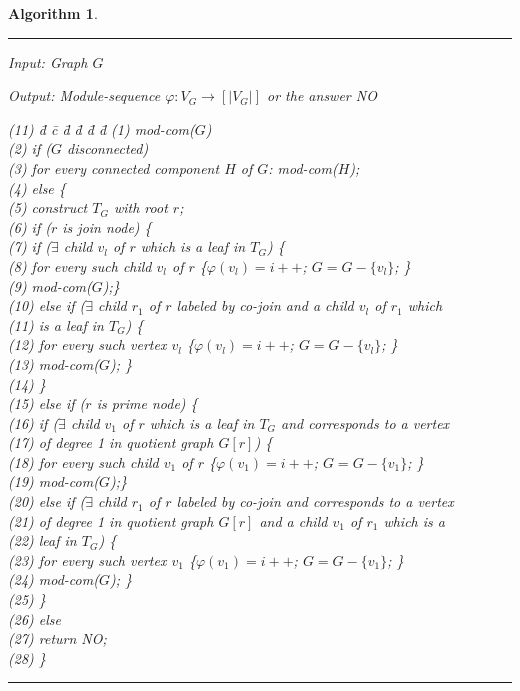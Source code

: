 \documentclass[11pt]{article}
\newtheorem{alg}[theorem]{Algorithm}
\begin{document}
\begin{alg} \label{a2} ~
\hrule

\medskip
\noindent
Input: Graph $G$

\noindent
Output: Module-sequence $\varphi: V_G \to [|V_G|]$ or the answer NO

\begin{tabbing}
(11) \= d \= c \=  d \=  d \=  d \=  d\kill
(1)  \>  mod-com($G$)   \\
(2)  \> \> if ($G$ disconnected)\\
(3)  \> \> \> for every connected component $H$ of $G$: mod-com($H$); \\
(4)  \> \> else \{ \\
(5)  \> \> \> construct $T_G$ with root $r$; \\
(6)  \> \> \> if ($r$ is join node) \{ \\
(7)  \> \> \> \> if ($\exists$ child $v_l$ of $r$ which is a leaf in $T_G$) \{  \\
(8)  \> \> \> \>    \>for every such child $v_l$ of $r$  \{$\varphi(v_l)=i++$; $G=G-\{v_l\}$; \}\\
(9)  \> \> \> \> \>mod-com($G$);\}\\
(10)  \> \> \> \> else if ($\exists$ child $r_1$ of $r$ labeled by co-join and a child $v_l$ of $r_1$ which \\
(11)  \> \> \> \> is a leaf in $T_G$) \{  \\
(12)  \> \> \> \>    \>for every such vertex $v_l$  \{$\varphi(v_l)=i++$; $G=G-\{v_l\}$; \}\\
(13) \> \> \> \> \>mod-com($G$); \} \\ 
(14)  \> \> \> \} \\
(15)  \> \> \> else if ($r$ is prime node) \{ \\
(16)  \> \> \> \> if ($\exists$ child $v_1$ of $r$ which is a leaf in $T_G$ and corresponds
to a vertex \\
(17)  \> \> \> \> of degree 1 in quotient graph $G[r]$) \{  \\
(18)  \> \> \> \>    \>for every such child $v_1$ of $r$  \{$\varphi(v_1)=i++$; $G=G-\{v_1\}$; \}\\
(19)  \> \> \> \> \>mod-com($G$);\}\\
(20)  \> \> \> \> else if ($\exists$ child $r_1$ of $r$ labeled by co-join and corresponds
to a vertex  \\
(21)  \> \> \> \> of degree 1 in quotient graph $G[r]$ and a child $v_1$ of $r_1$ which is a \\
(22)  \> \> \> \> leaf in $T_G$) \{  \\
(23)  \> \> \> \> \>for every such vertex $v_1$  \{$\varphi(v_1)=i++$; $G=G-\{v_1\}$; \}\\
(24)  \> \> \> \> \>mod-com($G$); \} \\ 
(25)  \> \> \> \} \\
(26)  \> \> \> else\\
(27)  \> \> \> \> return NO;\\
(28)  \> \> \} \\
\end{tabbing}

\vspace{-0.5cm}
\hrule
\end{alg}
\end{document}
